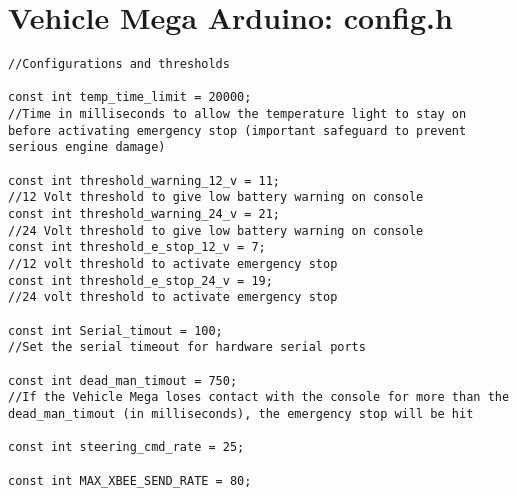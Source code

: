 \section*{Vehicle Mega Arduino: config.h}
\begin{lstlisting}[breaklines=true,basicstyle=\tiny]
//Configurations and thresholds

const int temp_time_limit = 20000;                                      //Time in milliseconds to allow the temperature light to stay on before activating emergency stop (important safeguard to prevent serious engine damage)

const int threshold_warning_12_v = 11;                                  //12 Volt threshold to give low battery warning on console
const int threshold_warning_24_v = 21;                                  //24 Volt threshold to give low battery warning on console
const int threshold_e_stop_12_v = 7;                                    //12 volt threshold to activate emergency stop
const int threshold_e_stop_24_v = 19;                                   //24 volt threshold to activate emergency stop

const int Serial_timout = 100;                                          //Set the serial timeout for hardware serial ports

const int dead_man_timout = 750;                                        //If the Vehicle Mega loses contact with the console for more than the dead_man_timout (in milliseconds), the emergency stop will be hit 

const int steering_cmd_rate = 25;

const int MAX_XBEE_SEND_RATE = 80;

\end{lstlisting}

